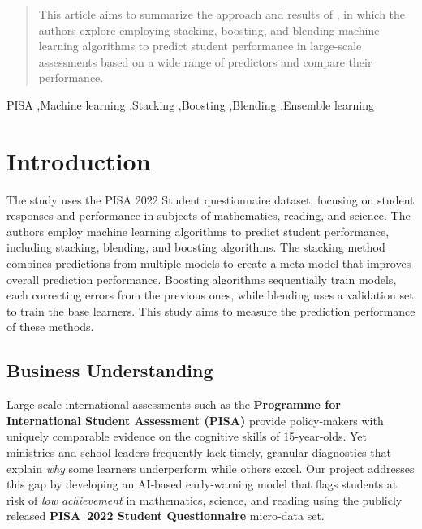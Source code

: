 \documentclass[final,5p,times,twocolumn,authoryear]{elsarticle}
\begin{document}
\begin{frontmatter}


  \begin{abstract}
    This article aims to summarize the approach and results of \cite{Stacking}, in which the authors explore employing stacking, boosting, and blending machine learning algorithms to predict student performance in large-scale assessments based on a wide range of predictors and compare their performance.
  \end{abstract}

  \begin{keyword}
    PISA \sep Machine learning \sep Stacking \sep Boosting \sep Blending \sep Ensemble
    learning
  \end{keyword}

\end{frontmatter}




\section{Introduction}
\label{introduction}

The study \cite{Stacking} uses the PISA 2022 Student questionnaire dataset, focusing on student responses and performance in subjects of mathematics, reading, and science. The authors employ machine learning algorithms to predict student performance, including stacking, blending, and boosting algorithms. The stacking method combines predictions from multiple models to create a meta-model that improves overall prediction performance. Boosting algorithms sequentially train models, each correcting errors from the previous ones, while blending uses a validation set to train the base learners. This study aims to measure the prediction performance of these methods.




\subsection{Business Understanding}
\label{sec:business_understanding}

Large‑scale international assessments such as the \textbf{Programme for International Student Assessment (PISA)} provide policy‑makers with uniquely comparable evidence on the cognitive skills of 15‑year‑olds.  Yet ministries and school leaders frequently lack timely, granular diagnostics that explain \emph{why} some learners underperform while others excel.  Our project addresses this gap by developing an AI‑based early‑warning model that flags students at risk of \textit{low achievement} in mathematics, science, and reading using the publicly released \textbf{PISA 2022 Student Questionnaire} micro‑data set.
\end{document}
